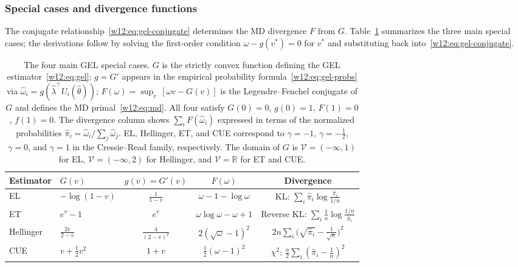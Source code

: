 \documentclass[master.tex]{subfiles}
\begin{document}
\subsubsection*{Special cases and divergence functions}

The conjugate relationship~\eqref{w12:eq:gel-conjugate} determines
the MD divergence $F$ from $G$.  Table~\ref{w12:tab:gel-cases}
summarizes the three main special cases; the derivations follow by
solving the first-order condition $\omega - g(v^*) = 0$ for $v^*$
and substituting back into~\eqref{w12:eq:gel-conjugate}.

\begin{table}[ht]
\centering
\small
\begin{tabular}{@{}llccc@{}}
\toprule
Estimator & $G(v)$ & $g(v) = G'(v)$ & $F(\omega)$ & Divergence \\
\midrule
EL  & $-\log(1-v)$ & $\displaystyle\frac{1}{1-v}$
    & $\omega - 1 - \log\omega$
    & KL: $\sum_i \hat\pi_i \log\frac{\hat\pi_i}{1/n}$ \\[8pt]
ET  & $e^v - 1$ & $e^{v}$
    & $\omega\log\omega - \omega + 1$
    & Reverse KL: $\sum_i \frac{1}{n}\log\frac{1/n}{\hat\pi_i}$ \\[6pt]
Hellinger & $\displaystyle\frac{2v}{2-v}$ & $\displaystyle\frac{4}{(2-v)^2}$
    & $2(\sqrt{\omega}-1)^2$
    & $2n\sum_i\!\bigl(\sqrt{\hat\pi_i}-\tfrac{1}{\sqrt{n}}\bigr)^{\!2}$ \\[8pt]
CUE & $v + \tfrac{1}{2}v^2$ & $1 + v$
    & $\tfrac{1}{2}(\omega - 1)^2$
    & $\chi^2$: $\tfrac{n}{2}\sum_i (\hat\pi_i - \tfrac{1}{n})^2$ \\
\bottomrule
\end{tabular}
\caption{The four main GEL special cases.  $G$ is the strictly
  convex function defining the GEL estimator~\eqref{w12:eq:gel};
  $g = G'$ appears in the empirical probability
  formula~\eqref{w12:eq:gel-probs} via $\hat\omega_i = g(\hat\lambda^\top
  U_i(\hat\theta))$; $F(\omega) = \sup_{v}\,[\omega v - G(v)]$ is
  the Legendre--Fenchel conjugate of $G$ and defines the MD
  primal~\eqref{w12:eq:md}.  All four satisfy $G(0)=0$,
  $g(0)=1$, $F(1)=0$, $f(1)=0$.  The divergence column shows
  $\sum_i F(\hat\omega_i)$ expressed in terms of the normalized
  probabilities $\hat\pi_i = \hat\omega_i/\sum_j\hat\omega_j$.
  EL, Hellinger, ET, and CUE correspond to $\gamma=-1$,
  $\gamma=-\tfrac{1}{2}$, $\gamma=0$, and $\gamma=1$ in the
  Cressie--Read family, respectively.  The domain of $G$ is
  $\mathcal{V}=(-\infty,1)$ for EL, $\mathcal{V}=(-\infty,2)$ for
  Hellinger, and $\mathcal{V}=\mathbb{R}$ for ET and CUE.}
\label{w12:tab:gel-cases}
\end{table}
\end{document}
